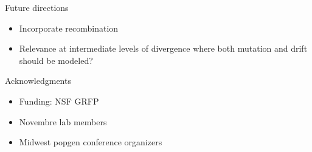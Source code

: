 \documentclass{beamer}
\begin{document}
\begin{frame}{Future directions}
  \begin{itemize}
  \item Incorporate recombination
  \item Relevance at intermediate levels of divergence where both mutation and
    drift should be modeled?
  \end{itemize}
\end{frame}

\begin{frame}{Acknowledgments}
  \begin{itemize}
  \item Funding: NSF GRFP
  \item Novembre lab members
  \item Midwest popgen conference organizers
  \end{itemize}
\end{frame}
\end{document}
